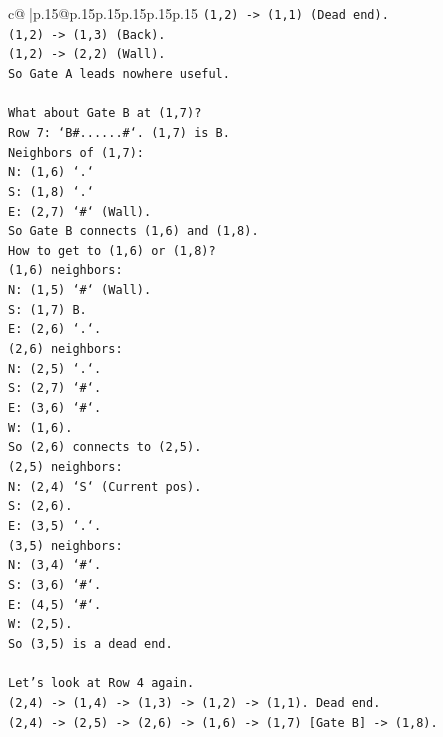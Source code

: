 \documentclass{article}
\begin{document}
{\begin{supertabular}{c@{$\;$}|p{.15\linewidth}@{}p{.15\linewidth}p{.15\linewidth}p{.15\linewidth}p{.15\linewidth}p{.15\linewidth}}
{{{\texttt{(1,2) {-}> (1,1) (Dead end).} \\
\texttt{(1,2) {-}> (1,3) (Back).} \\
\texttt{(1,2) {-}> (2,2) (Wall).} \\
\texttt{So Gate A leads nowhere useful.} \\
\\ 
\texttt{What about Gate B at (1,7)?} \\
\texttt{Row 7: `B\#......\#`. (1,7) is B.} \\
\texttt{Neighbors of (1,7):} \\
\texttt{N: (1,6) `.`} \\
\texttt{S: (1,8) `.`} \\
\texttt{E: (2,7) `\#` (Wall).} \\
\texttt{So Gate B connects (1,6) and (1,8).} \\
\texttt{How to get to (1,6) or (1,8)?} \\
\texttt{(1,6) neighbors:} \\
\texttt{N: (1,5) `\#` (Wall).} \\
\texttt{S: (1,7) B.} \\
\texttt{E: (2,6) `.`.} \\
\texttt{(2,6) neighbors:} \\
\texttt{N: (2,5) `.`.} \\
\texttt{S: (2,7) `\#`.} \\
\texttt{E: (3,6) `\#`.} \\
\texttt{W: (1,6).} \\
\texttt{So (2,6) connects to (2,5).} \\
\texttt{(2,5) neighbors:} \\
\texttt{N: (2,4) `S` (Current pos).} \\
\texttt{S: (2,6).} \\
\texttt{E: (3,5) `.`.} \\
\texttt{(3,5) neighbors:} \\
\texttt{N: (3,4) `\#`.} \\
\texttt{S: (3,6) `\#`.} \\
\texttt{E: (4,5) `\#`.} \\
\texttt{W: (2,5).} \\
\texttt{So (3,5) is a dead end.} \\
\\ 
\texttt{Let's look at Row 4 again.} \\
\texttt{(2,4) {-}> (1,4) {-}> (1,3) {-}> (1,2) {-}> (1,1). Dead end.} \\
\texttt{(2,4) {-}> (2,5) {-}> (2,6) {-}> (1,6) {-}> (1,7) {[}Gate B{]} {-}> (1,8).} \\
}}}
\end{supertabular}}
\end{document}
